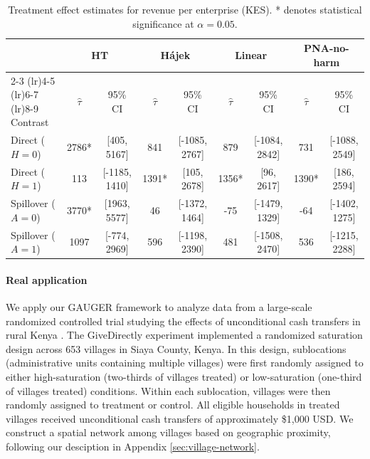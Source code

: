 \documentclass[twoside]{article}
\theoremstyle{plain}
\theoremstyle{definition}
\theoremstyle{remark}
\begin{document}
\begin{table}[t]
    \centering
    \caption{Treatment effect estimates for revenue per enterprise (KES). * denotes statistical significance at $\alpha=0.05$.}
    \label{tab:revenue_results}
    \footnotesize
    \begin{tabular}{l cc cc cc cc}
        \toprule
        & \multicolumn{2}{c}{HT} & \multicolumn{2}{c}{H\'{a}jek} & \multicolumn{2}{c}{Linear} & \multicolumn{2}{c}{PNA-no-harm} \\
        \cmidrule(lr){2-3} \cmidrule(lr){4-5} \cmidrule(lr){6-7} \cmidrule(lr){8-9}
        Contrast & $\hat\tau$ & 95\% CI & $\hat\tau$ & 95\% CI & $\hat\tau$ & 95\% CI & $\hat\tau$ & 95\% CI \\
        \midrule
        Direct ($H=0$) & 2786* & [405, 5167] & 841 & [-1085, 2767] & 879 & [-1084, 2842] & 731 & [-1088, 2549] \\
        Direct ($H=1$) & 113 & [-1185, 1410] & 1391* & [105, 2678] & 1356* & [96, 2617] & 1390* & [186, 2594] \\
        Spillover ($A=0$) & 3770* & [1963, 5577] & 46 & [-1372, 1464] & -75 & [-1479, 1329] & -64 & [-1402, 1275] \\
        Spillover ($A=1$) & 1097 & [-774, 2969] & 596 & [-1198, 2390] & 481 & [-1508, 2470] & 536 & [-1215, 2288] \\
        \bottomrule
    \end{tabular}
\end{table}

\paragraph{Real application}
We apply our GAUGER framework to analyze data from a large-scale randomized controlled trial studying the effects of unconditional cash transfers in rural Kenya \citep{egger2022general}. The GiveDirectly experiment implemented a randomized saturation design across 653 villages in Siaya County, Kenya. In this design, sublocations (administrative units containing multiple villages) were first randomly assigned to either high-saturation (two-thirds of villages treated) or low-saturation (one-third of villages treated) conditions. Within each sublocation, villages were then randomly assigned to treatment or control. All eligible households in treated villages received unconditional cash transfers of approximately \$1,000 USD. We construct a spatial network among villages based on geographic proximity, following our desciption in Appendix \ref{sec:village-network}.
\end{document}

